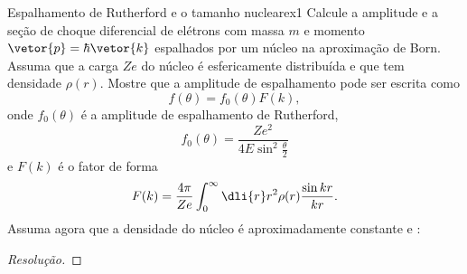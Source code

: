 \begin{exercício}{Espalhamento de Rutherford e o tamanho nuclear}{ex1}
   Calcule a amplitude e a seção de choque diferencial de elétrons com massa \(m\) e momento \(\vetor{p} = \hbar \vetor{k}\) espalhados por um núcleo na aproximação de Born. Assuma que a carga \(Ze\) do núcleo é esfericamente distribuída e que tem densidade \(\rho(r)\). Mostre que a amplitude de espalhamento pode ser escrita como
   \begin{equation*}
       f(\theta) = f_0(\theta) F(k),
   \end{equation*}
   onde \(f_0(\theta)\) é a amplitude de espalhamento de Rutherford,
   \begin{equation*}
      f_0(\theta) = \frac{Ze^2}{4E\sin^2\frac{\theta}{2}}
   \end{equation*}
   e \(F(k)\) é o fator de forma
   \begin{equation*}
      F(k) = \frac{4\pi}{Ze} \int_0^\infty \dli{r} r^2 \rho(r) \frac{\sin kr}{kr}.
   \end{equation*}
   Assuma agora que a densidade do núcleo é aproximadamente constante e :
\end{exercício}
\begin{proof}[Resolução]
    
\end{proof}
